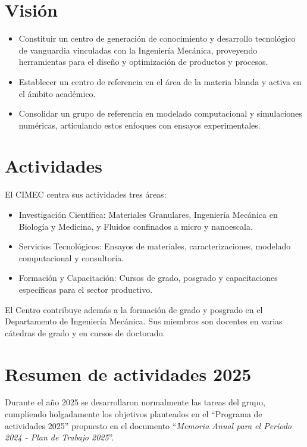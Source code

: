 \documentclass[a4paper,11pt,twoside,final,titlepage,onecolumn,openright]{report}
\begin{document}
\section{Visión}

\begin{itemize}
	\item Constituir un centro de generación de conocimiento y desarrollo tecnológico de vanguardia vinculadas con la Ingeniería Mecánica, proveyendo herramientas para el diseño y optimización de productos y procesos.
	\item Establecer un centro de referencia en el área de la materia blanda y activa en el ámbito académico.
	\item Consolidar un grupo de referencia en modelado computacional y simulaciones numéricas, articulando estos enfoques con ensayos experimentales.
\end{itemize}

\section{Actividades}

El CIMEC centra sus actividades tres áreas:
\begin{itemize}
	\item Investigación Científica: Materiales Granulares, Ingeniería Mecánica en Biología y Medicina, y Fluidos confinados a micro y nanoescala.
	\item Servicios Tecnológicos: Ensayos de materiales, caracterizaciones, modelado computacional y consultoría.
	\item Formación y Capacitación: Cursos de grado, posgrado y capacitaciones específicas para el sector productivo.
\end{itemize}


El Centro contribuye además a la formación de grado y posgrado en el Departamento de Ingeniería Mecánica. Sus miembros son docentes en varias cátedras de grado y en cursos de doctorado.


\section{Resumen de actividades 2025}

Durante el año 2025 se desarrollaron normalmente las tareas del grupo, cumpliendo holgadamente los objetivos planteados en el ``Programa de actividades 2025'' propuesto en el documento ``\textit{Memoria Anual para el Período 2024 - Plan de Trabajo 2025}''.
\end{document}
